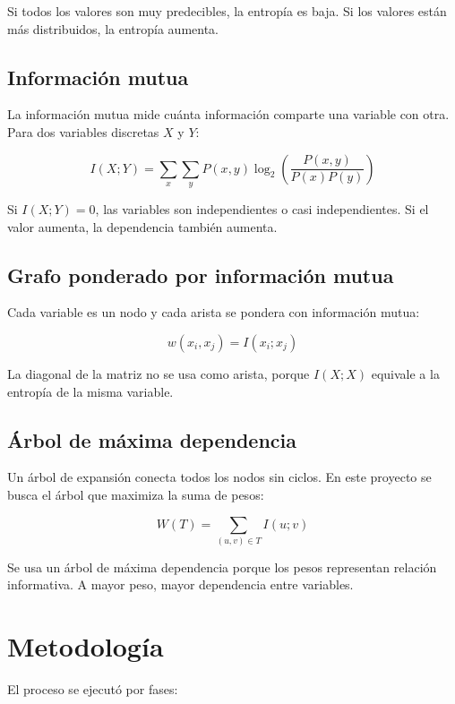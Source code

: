 \documentclass[12pt,a4paper]{article}
\newcommand{\formula}[1]{
\begin{cajaformula}
\centering
#1
\end{cajaformula}
}
\begin{document}
Si todos los valores son muy predecibles, la entropía es baja. Si los valores están más distribuidos, la entropía aumenta.

\subsection{Información mutua}

La información mutua mide cuánta información comparte una variable con otra. Para dos variables discretas \(X\) y \(Y\):

\formula{
\[
I(X;Y)=\sum_x\sum_y P(x,y)\log_2\left(\frac{P(x,y)}{P(x)P(y)}\right)
\]
}

Si \(I(X;Y)=0\), las variables son independientes o casi independientes. Si el valor aumenta, la dependencia también aumenta.

\subsection{Grafo ponderado por información mutua}

Cada variable es un nodo y cada arista se pondera con información mutua:

\formula{
\[
w(x_i,x_j)=I(x_i;x_j)
\]
}

La diagonal de la matriz no se usa como arista, porque \(I(X;X)\) equivale a la entropía de la misma variable.

\subsection{Árbol de máxima dependencia}

Un árbol de expansión conecta todos los nodos sin ciclos. En este proyecto se busca el árbol que maximiza la suma de pesos:

\formula{
\[
W(T)=\sum_{(u,v)\in T} I(u;v)
\]
}

Se usa un árbol de máxima dependencia porque los pesos representan relación informativa. A mayor peso, mayor dependencia entre variables.

\section{Metodología}

El proceso se ejecutó por fases:
\end{document}
